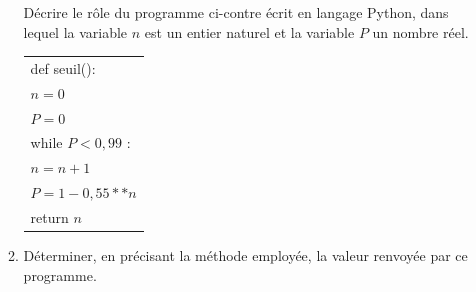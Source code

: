 \documentclass[10pt]{article}
\begin{document}
\begin{enumerate}
\begin{enumerate}
\begin{minipage}{6cm}Décrire le rôle du programme ci-contre écrit en langage Python, dans lequel la variable $n$ est un entier naturel et la variable $P$ un nombre réel.
\end{minipage} \hfill \begin{minipage}{6cm}
\begin{tabular}{|l|}\hline
def seuil():\\
\qquad $n=0$\\
\qquad $P=0$\\
\qquad while $P< 0,99$ :\\
\qquad \quad $n = n+1$\\
\qquad \quad $P=1 - 0,55**n$\\
\qquad return $n$\\ \hline
\end{tabular}
\end{minipage}
		\item Déterminer, en précisant la méthode employée, la valeur renvoyée par ce programme.
	\end{enumerate}
\end{enumerate}

\bigskip
\end{document}
